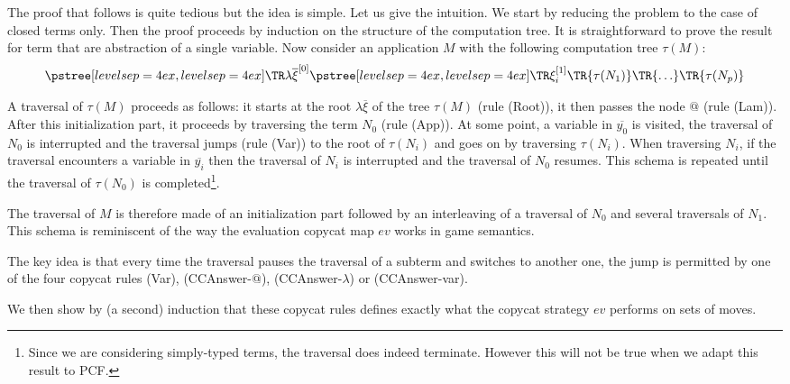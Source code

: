 \begin{rem} The proof that follows is quite tedious but the idea is simple. Let us give the intuition.
    We start by reducing the problem to the case of closed terms only. Then the proof proceeds by induction on the structure of the computation tree.
    It is straightforward to prove the result for term that are abstraction of a single variable.
    Now consider an application $M$ with the following computation tree $\tau(M)$:
    $$ \tree[levelsep=4ex]{\lambda \overline{\xi}^{[0]}}
        { \tree[levelsep=4ex]{\xi_i^{[1]}}
            {   \TR{\tau(N_1)} \TR{\ldots} \TR{\tau(N_p)}}}
    $$

    A traversal of $\tau(M)$ proceeds as follows: it starts at the root $\lambda \overline{\xi}$ of the tree $\tau(M)$ (rule
    (Root)), it then passes the node $@$ (rule (Lam)).
    After this initialization part, it proceeds by traversing the term $N_0$ (rule (App)).
    At some point, a variable in $\overline{y_0}$ is visited, the traversal
    of $N_0$ is interrupted and the traversal jumps (rule (Var)) to the root of $\tau(N_i)$ and goes on by traversing $\tau(N_i)$.
    When traversing $N_i$, if the traversal encounters a variable in $\overline{y_i}$ then the traversal of $N_i$ is interrupted and
    the traversal of $N_0$ resumes.  This schema is repeated until the traversal of $\tau(N_0)$ is completed\footnote{Since we are considering
    simply-typed terms, the traversal does indeed terminate. However this will not be true when we adapt this result to PCF.}.

    The traversal of $M$ is therefore made of an initialization part followed by an interleaving of a traversal of $N_0$ and
    several traversals of $N_1$. This schema is reminiscent of the way the evaluation copycat map $ev$ works in game semantics.

    The key idea is that every time the traversal pauses the traversal of a subterm and switches to another one,
    the jump is permitted by one of the four copycat rules (Var), (CCAnswer-$@$), (CCAnswer-$\lambda$) or (CCAnswer-var).

    We then show by (a second) induction that these copycat rules defines exactly what the copycat strategy $ev$ performs on sets of moves.


\end{rem}
